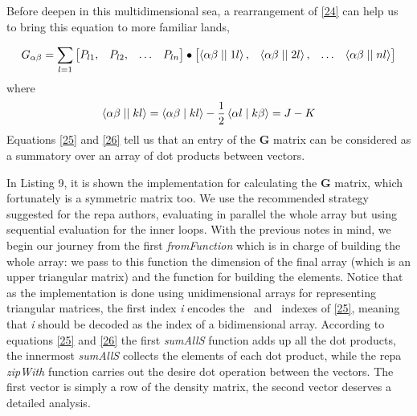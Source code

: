 \documentclass{tmr}
\begin{document}
\par Before deepen in this multidimensional sea, a rearrangement of \eqref{24} can help us
to bring this equation to more familiar lands,

\begin{equation} \label{25}
G_{\alpha \beta} =
\sum_{l=1}
\begin{bmatrix}
 P_{l1}, & P_{l2}, & \hdots & P_{ln} \\
\end{bmatrix}
\bullet
\begin{bmatrix}
\braket{\alpha \beta \mid \mid 1 l}, & \braket{\alpha \beta \mid \mid 2 l}, & 
\hdots & \braket{\alpha \beta \mid \mid n l } \\
\end{bmatrix}
\end{equation}
where 
\begin{equation} \label{26}
\braket{\alpha \beta \mid \mid k l} = 
\braket{\alpha \beta \mid k l} - \frac{1}{2} \braket{\alpha l \mid k \beta} = 
J - K 
\end{equation}
Equations \eqref{25} and \eqref{26} tell us that an entry of the 
\textbf{G} matrix can be considered as a summatory over an array of 
dot products between vectors.

In Listing 9, it is shown the implementation for calculating the \textbf{G} matrix, which
fortunately is a symmetric matrix too.  We use the recommended strategy suggested 
for the repa authors, evaluating in parallel the whole array but using sequential
evaluation for the inner loops. With the previous notes in mind, we begin our journey from
the first \textit{fromFunction} which is in charge of building the whole array: we pass to
this function the dimension of the final array (which is an upper triangular matrix) and 
the function for building the elements. Notice that 
as the implementation is done using unidimensional arrays for representing triangular
matrices, the first index \textit{i} encodes the \textalpha\ and \textbeta\ indexes of
\eqref{25}, meaning that \textit{i} should be decoded as the index of a bidimensional 
array. According to equations \eqref{25} and \eqref{26} the first
\textit{sumAllS} function adds up all the dot products, the innermost \textit{sumAllS}
collects the elements of each dot product, while the repa \textit{zipWith} function carries out
the desire dot operation between the vectors. The first vector is simply a row of the
density matrix, the second vector deserves a detailed analysis. 
\end{document}
